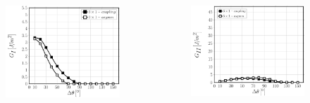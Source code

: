 \documentclass[first,firstsupp,lastsupp,last,hyperref,table]{ETHclass}
\begin{document}
\begin{frame}
\begin{columns}[c]
\end{columns}
\vspace{-0.35cm}
\begin{columns}[c]
\centering
\begin{column}{0.5\textwidth}
\centering
\begin{figure}
\centering
\includegraphics[width=\columnwidth]{nx1-coupling-vf60-GI-strainmagn3.pdf}
\end{figure}
\end{column}
\begin{column}{0.5\textwidth}
\centering
\begin{figure}
\centering
\includegraphics[width=\columnwidth]{nx1-coupling-vf60-GII-strainmagn3.pdf}
\end{figure}
\end{column}
\end{columns}
\end{frame}
\end{document}
